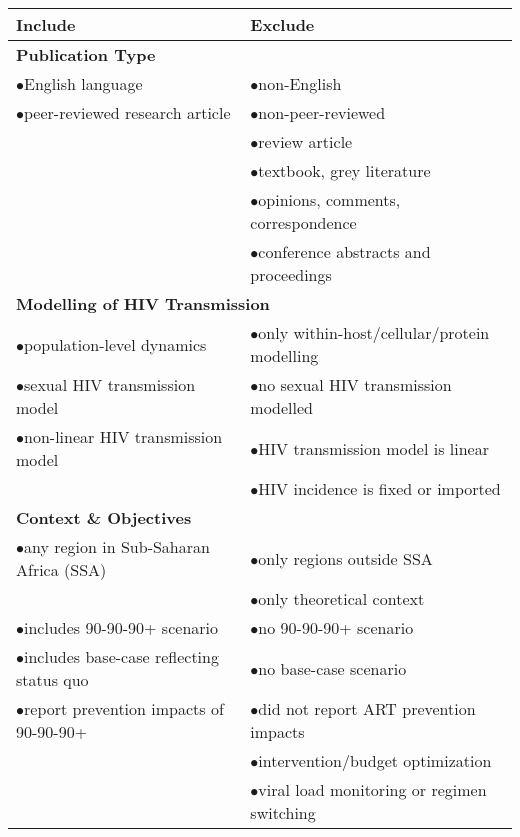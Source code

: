\newcommand{\tabitem}{$\bullet$\hspace{.5em}\ignorespaces}
\begin{tabular}{ll}
  \toprule
  Include & Exclude \\
  \midrule
  \multicolumn{2}{l}{\textbf{Publication Type}} \\
  \midrule
  \tabitem English language               & \tabitem non-English \\
  \tabitem peer-reviewed research article & \tabitem non-peer-reviewed \\
                                          & \tabitem review article \\
                                          & \tabitem textbook, grey literature \\
                                          & \tabitem opinions, comments, correspondence \\
                                          & \tabitem conference abstracts and proceedings \\
  \midrule
  \multicolumn{2}{l}{\textbf{Modelling of HIV Transmission}} \\
  \midrule
  \tabitem population-level dynamics               & \tabitem only within-host/cellular/protein modelling \\
  \tabitem sexual HIV transmission model           & \tabitem no sexual HIV transmission modelled \\
  \tabitem non-linear HIV transmission model\tn{*} & \tabitem HIV transmission model is linear \\
                                                   & \tabitem HIV incidence is fixed or imported \\
  \midrule
  \multicolumn{2}{l}{\textbf{Context \& Objectives}} \\
  \midrule
  \tabitem any region in Sub-Saharan Africa (SSA)\tn{*} & \tabitem only regions outside SSA\tn{*}\\
                                                        & \tabitem only theoretical context \\
  \tabitem includes 90-90-90+ scenario\tn{*}            & \tabitem no 90-90-90+ scenario\tn{*}   \\
  \tabitem includes base-case reflecting status quo     & \tabitem no base-case scenario \\
  \tabitem report prevention impacts of 90-90-90+\tn{*} & \tabitem did not report ART prevention impacts\tn{*} \\
                                                        & \tabitem intervention/budget optimization \\
                                                        & \tabitem viral load monitoring or regimen switching \\
  \bottomrule
\end{tabular}
